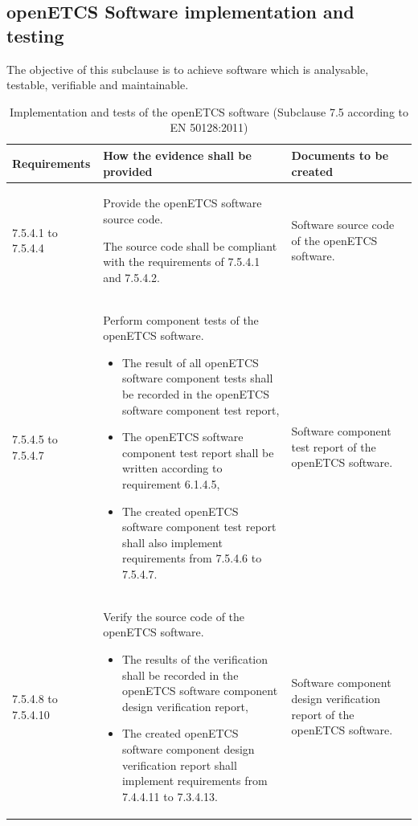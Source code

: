 \documentclass{template/openetcs_report}
\begin{document}
\subsection{openETCS Software implementation and testing}
\begin{flushleft}
The objective of this subclause is to achieve software which is analysable, testable, verifiable and maintainable.
\end{flushleft}
{\footnotesize\sffamily\centering
\begin{longtable}{|p{2cm}|p{9cm}|p{3cm}|}
\caption{Implementation and tests of the openETCS software (Subclause 7.5 according to EN 50128:2011)}\\
\hline
\bfseries Requirements & \bfseries How the evidence shall be provided & \bfseries Documents to be created\\
\hline
\hline
\endhead
\hline
\endfoot

7.5.4.1 to 7.5.4.4 & Provide the openETCS software source code.

The source code shall be compliant with the requirements of 7.5.4.1 and 7.5.4.2.
& Software source code of the openETCS software.\\ 
\hline
7.5.4.5 to 7.5.4.7 & Perform component tests of the openETCS software.
\begin{itemize}\itemsep=0pt
  \item The result of all openETCS software component tests shall be recorded in the openETCS software component test report,
  \item The openETCS software component test report shall be written according to requirement 6.1.4.5,
  \item The created openETCS software component test report shall also implement requirements from 7.5.4.6 to 7.5.4.7.
\end{itemize}
& Software component test report of the openETCS software.\\ 
\hline
7.5.4.8 to 7.5.4.10 & Verify the source code of the openETCS software.
\begin{itemize}\itemsep=0pt
  \item The results of the verification shall be recorded in the openETCS software component design verification report,
  \item The created openETCS software component design verification report shall implement requirements from 7.4.4.11 to 7.3.4.13.
\end{itemize}
& Software component design verification report of the openETCS software.\\ 
\hline
\end{longtable}}
\end{document}
